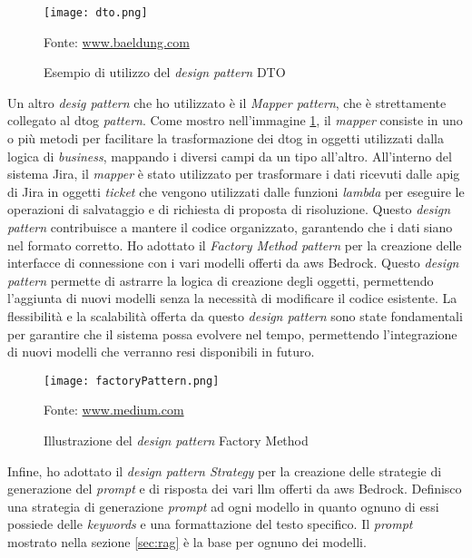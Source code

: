 \begin{figure}[H]
    \centering
    \texttt{[image: dto.png]}
    \caption{Esempio di utilizzo del \textit{design pattern} DTO}
    \small Fonte: \href{https://www.baeldung.com/java-dto-pattern} {www.baeldung.com}
    \label{fig:dto}
\end{figure}
\noindent
Un altro \textit{desig pattern} che ho utilizzato è il \textit{Mapper pattern}, che è strettamente collegato al \gls{dtog} \textit{pattern}.  Come mostro nell'immagine \ref{fig:dto}, il \textit{mapper} consiste in uno o più metodi per facilitare la trasformazione dei \gls{dtog} in oggetti utilizzati dalla logica di \textit{business}, mappando i diversi campi da un tipo all’altro. All'interno del sistema Jira, il \textit{mapper} è stato utilizzato per trasformare i dati ricevuti dalle \gls{apig} di Jira in oggetti \textit{ticket} che vengono utilizzati dalle funzioni \textit{lambda} per eseguire le operazioni di salvataggio e di richiesta di proposta di risoluzione.
Questo \textit{design pattern} contribuisce a mantere il codice organizzato, garantendo che i dati siano nel formato corretto. Ho adottato il \textit{Factory Method pattern} per la creazione delle interfacce di connessione con i vari modelli offerti da \gls{aws} Bedrock. Questo \textit{design pattern} permette di astrarre la logica di creazione degli oggetti, permettendo l'aggiunta di nuovi modelli senza la necessità di modificare il codice esistente. La flessibilità e la scalabilità
offerta da questo \textit{design pattern} sono state fondamentali per garantire che il sistema possa evolvere nel tempo, permettendo l'integrazione di nuovi modelli che verranno resi disponibili in futuro. 
\begin{figure}[H]
    \centering
    \texttt{[image: factoryPattern.png]}
    \caption{Illustrazione del \textit{design pattern} Factory Method}
    \small Fonte: \href{https://medium.com/@contactkumaramit9139/factory-design-pattern-in-java-baee365fc1ce} {www.medium.com}
    \label{fig:factory}
\end{figure}
\noindent
Infine, ho adottato il \textit{design pattern Strategy} per la creazione delle strategie di generazione del \textit{prompt} e di risposta dei vari \gls{llm} offerti da \gls{aws} Bedrock. Definisco una strategia di generazione \textit{prompt} ad ogni modello in quanto ognuno di essi possiede delle \textit{keywords} e una formattazione del testo specifico. Il \textit{prompt} mostrato nella sezione \ref{sec:rag} è la base per ognuno dei modelli. 

